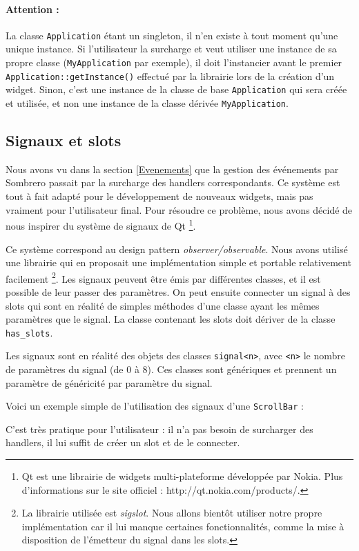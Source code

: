 

\paragraph{Attention :}
La classe \verb|Application| étant un singleton, il n'en existe à tout moment qu'une unique instance.
Si l'utilisateur la surcharge et veut utiliser une instance de sa propre classe (\verb|MyApplication| par exemple), il doit l'instancier avant le premier \verb|Application::getInstance()| effectué par la librairie lors de la création d'un widget. Sinon, c'est une instance de la classe de base \verb|Application| qui sera créée et utilisée, et non une instance de la classe dérivée \verb|MyApplication|.

\subsection{Signaux et slots}

Nous avons vu dans la section \ref{Evenements} que la gestion des événements par Sombrero passait par la surcharge des handlers correspondants.
Ce système est tout à fait adapté pour le développement de nouveaux widgets, mais pas vraiment pour l'utilisateur final.
Pour résoudre ce problème, nous avons décidé de nous inspirer du système de signaux de Qt
\footnote{Qt est une librairie de widgets multi-plateforme développée par Nokia. Plus d'informations sur le site officiel : http://qt.nokia.com/products/.}.

Ce système correspond au design pattern \textit{observer/observable}.
Nous avons utilisé une librairie qui en proposait une implémentation simple et portable relativement facilement
\footnote{La librairie utilisée est \textit{sigslot}. Nous allons bientôt utiliser notre propre implémentation car il lui manque certaines fonctionnalités, comme la mise à disposition de l'émetteur du signal dans les slots.}.
Les signaux peuvent être émis par différentes classes, et il est possible de leur passer des paramètres.
On peut ensuite connecter un signal à des slots qui sont en réalité de simples méthodes d'une classe ayant les mêmes paramètres que le signal.
La classe contenant les slots doit dériver de la classe \verb|has_slots|.

Les signaux sont en réalité des objets des classes \verb|signal<n>|, avec \verb|<n>| le nombre de paramètres du signal (de 0 à 8).
Ces classes sont génériques et prennent un paramètre de généricité par paramètre du signal.

Voici un exemple simple de l'utilisation des signaux d'une \verb|ScrollBar| :



C'est très pratique pour l'utilisateur : il n'a pas besoin de surcharger des handlers, il lui suffit de créer un slot et de le connecter.

